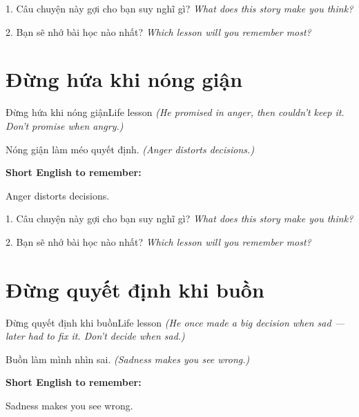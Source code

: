 \begin{tuhocnhanh}
1. Câu chuyện này gợi cho bạn suy nghĩ gì? \textit{What does this story make you think?}

2. Bạn sẽ nhớ bài học nào nhất? \textit{Which lesson will you remember most?}
\end{tuhocnhanh}
\ngancach


\section{Đừng hứa khi nóng giận}
\begin{truyen}{Đừng hứa khi nóng giận}{Life lesson}
\textit{(He promised in anger, then couldn't keep it. Don't promise when angry.)}
\end{truyen}

\begin{baihoc}
Nóng giận làm méo quyết định.
\textit{(Anger distorts decisions.)}
\end{baihoc}

\begin{ghinhoanh}
\textbf{Short English to remember:}

Anger distorts decisions.

\end{ghinhoanh}

\begin{tuhocnhanh}
1. Câu chuyện này gợi cho bạn suy nghĩ gì? \textit{What does this story make you think?}

2. Bạn sẽ nhớ bài học nào nhất? \textit{Which lesson will you remember most?}
\end{tuhocnhanh}
\ngancach


\section{Đừng quyết định khi buồn}
\begin{truyen}{Đừng quyết định khi buồn}{Life lesson}
\textit{(He once made a big decision when sad — later had to fix it. Don't decide when sad.)}
\end{truyen}

\begin{baihoc}
Buồn làm mình nhìn sai.
\textit{(Sadness makes you see wrong.)}
\end{baihoc}

\begin{ghinhoanh}
\textbf{Short English to remember:}

Sadness makes you see wrong.

\end{ghinhoanh}

